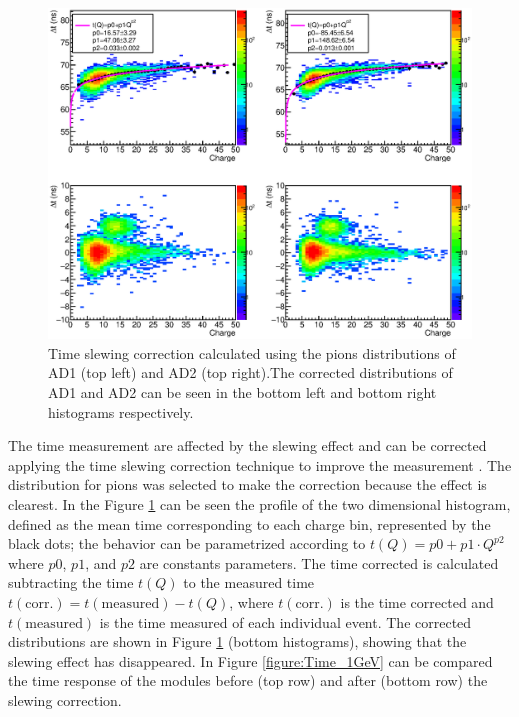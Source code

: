 	\begin{figure}[h!]
	  \begin{center}
	\includegraphics[scale=0.55]{./images/time/1GeV/NoteSlewH2.eps}%
	\caption{
	Time slewing correction calculated using the pions distributions of AD1 (top left) and AD2 (top right).The corrected distributions of AD1 and AD2 can be seen in the bottom left and bottom right histograms respectively.
	}
	\label{figure:TimeQSlew_1GeV}
	  \end{center}
	\end{figure}
	
	The time measurement are affected by
	the slewing effect and can be corrected applying the time slewing correction technique to improve the measurement \cite{V0Performance}. %
	The distribution for pions was selected to make the correction because the
	effect is clearest. In the Figure \ref{figure:TimeQSlew_1GeV} can be seen the profile of the two dimensional histogram, defined as the mean time corresponding to each charge bin, represented by the black dots; the behavior can be parametrized according to 
	$t(Q)=p0+p1\cdot Q^{p2}$ where $p0$, $p1$, and $p2$ are constants parameters. 
	The time corrected is calculated subtracting the time $t(Q)$ to the measured time 
	$ t(\textrm{corr.})=t(\textrm{measured})-t(Q)$, where $t(\textrm{corr.})$ is the time corrected and
	$t(\textrm{measured})$ is the time measured of each individual event. The corrected distributions are shown in Figure \ref{figure:TimeQSlew_1GeV} (bottom histograms), showing that the slewing effect has disappeared. In Figure
	\ref{figure:Time_1GeV} can be compared the time response of the modules before (top row) and after (bottom
	row) the slewing correction.%
	
